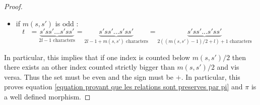 \documentclass[envcountsame,envcountchap]{svmono}
\newcommand{\qq}{\text{ }}
\begin{document}
\begin{proof}
\begin{itemize}
			\item  if $ m(s,s')$ is odd :
			\begin{equation}
			t\qq=\underset{2l-1 \mbox{ characters}}{\underbrace{s'ss'...s'ss'}}=\underset{2l-1 +m(s,s') \mbox{ characters}}{\underbrace{s'ss'...s'ss'}}= \underset{2((m(s,s')-1)/2+l)+1 \mbox{ characters}}{\underbrace{s'ss'...s'ss'}}
			\end{equation}
		\end{itemize}
	In particular, this implies that if one index is counted below $m(s,s')/2$ then there exists an other index counted strictly bigger than $m(s,s')/2$ and vis versa. Thus the set must be even and the sign must be $+$. In particular, this proves equation \eqref{equation provant que les relations sont preserves par pi} and $\pi$ is a well defined morphism.


\end{proof}
\end{document}
